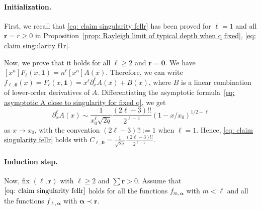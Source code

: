\documentclass{article}
\theoremstyle{remark}
\newcommand{\br}{{\mathbf{r}}}
\begin{document}
\paragraph{Initialization.}
First, we recall that \eqref{eq: claim singularity fellr} has been proved for $\ell=1$ and all $\br = r \ge0$ in Proposition~\ref{prop: Rayleigh limit of typical depth when q fixed}, \eqref{eq: claim singularity f1r}.

Now, we prove that it holds for all $\ell\ge2$ and $\br = \bm{0}$.
We have $[x^n] F_\ell(x,\bm{1}) = n^\ell [x^n] A(x)$.
Therefore, we can write $f_{\ell,\bm{0}}(x) = F_\ell(x,\bm{1}) = x^\ell \partial_x^\ell A(x) + B(x)$, where $B$ is a linear combination of lower-order derivatives of $A$.
Differentiating the asymptotic formula~\eqref{eq: asymptotic A close to singularity for fixed q}, we get
\begin{equation}\label{eq: singularity for multiple derivatives of A}
\partial_x^\ell A(x) 
\sim \frac{1}{x_0^\ell \sqrt{2q}} \frac{(2\ell-3)!!}{2^{\ell-1}} (1-x/x_0)^{1/2 - \ell}
\end{equation}
as $x\to x_0$, with the convention $(2\ell-3)!! := 1$ when $\ell=1$.
Hence, \eqref{eq: claim singularity fellr} holds with $C_{\ell,\bm{0}} = \frac{1}{\sqrt{2q}} \frac{(2\ell-3)!!}{2^{\ell-1}}$.

\paragraph{Induction step.}
Now, fix $(\ell,\br)$ with $\ell\ge2$ and $\sum\br > 0$.
Assume that $\eqref{eq: claim singularity fellr}$ holds for all the functions $f_{m,\bm{\alpha}}$ with $m<\ell$ and all the functions $f_{\ell,\bm{\alpha}}$ with $\bm{\alpha}\prec\br$.
\end{document}
